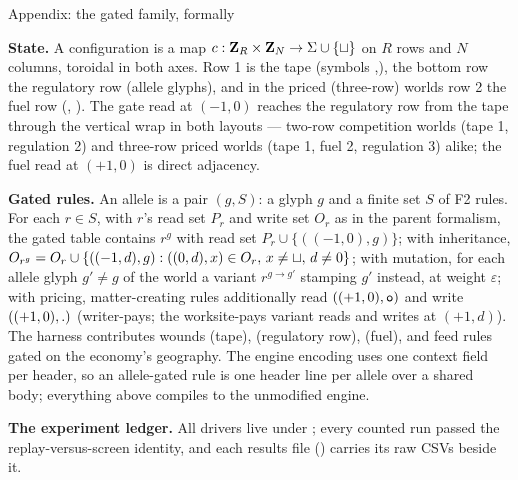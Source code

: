 \sec Appendix: the gated family, formally

{\bf State.} A configuration is a map
$c:{\bf Z}_R\times{\bf Z}_N\to\Sigma\cup\{\sqcup\}$ on $R$ rows and
$N$ columns, toroidal in both axes. Row 1 is the tape (symbols
,), the bottom row the regulatory row (allele glyphs),
and in the priced (three-row) worlds row 2 the fuel row (,
). The gate read at $(-1,0)$ reaches the regulatory row from
the tape through the vertical wrap in both layouts --- two-row
competition worlds (tape 1, regulation 2) and three-row priced
worlds (tape 1, fuel 2, regulation 3) alike; the fuel read at
$(+1,0)$ is direct adjacency.

{\bf Gated rules.} An allele is a pair $(g, S)$: a glyph $g$ and
a finite set $S$ of F2 rules. For each $r\in S$, with $r$'s read
set $P_r$ and write set $O_r$ as in the parent formalism, the
gated table contains $r^g$ with read set
$P_r\cup\{((-1,0),g)\}$; with inheritance,
$O_{r^g}=O_r\cup\{((-1,d),g):((0,d),x)\in O_r,\,x\ne\sqcup,\,
d\ne0\}$; with mutation, for each allele glyph $g'\ne g$ of the
world a variant $r^{g\to g'}$ stamping $g'$ instead, at weight
$\varepsilon$; with pricing, matter-creating rules additionally
read $((+1,0),{\tt o})$ and write $((+1,0),{\tt .})$ (writer-pays; the
worksite-pays variant reads and writes at $(+1,d)$). The harness
contributes wounds  (tape),  (regulatory row), 
(fuel), and feed rules gated on the economy's geography. The
engine encoding uses one context field per header, so an
allele-gated rule is one header line per allele over a shared
body; everything above compiles to the unmodified engine.

{\bf The experiment ledger.} All drivers live under
; every counted run passed the
replay-versus-screen identity, and each results file
() carries its raw CSVs beside it.

\medskip
\noindent{}
\medskip

